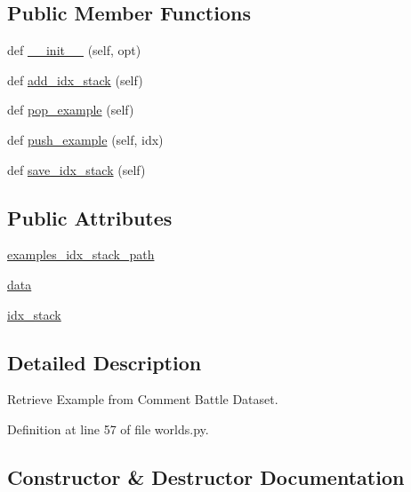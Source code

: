 \subsection*{Public Member Functions}
\begin{DoxyCompactItemize}
\item 
def \hyperlink{classigc__evals_1_1worlds_1_1IGCExampleGenerator_a44d9772a080f6ec923cdd13392a47f5e}{\+\_\+\+\_\+init\+\_\+\+\_\+} (self, opt)
\item 
def \hyperlink{classigc__evals_1_1worlds_1_1IGCExampleGenerator_aa0801aa3a53c7fd57a759c2080936174}{add\+\_\+idx\+\_\+stack} (self)
\item 
def \hyperlink{classigc__evals_1_1worlds_1_1IGCExampleGenerator_a68420b6b80ae5d3a8825302359371ed5}{pop\+\_\+example} (self)
\item 
def \hyperlink{classigc__evals_1_1worlds_1_1IGCExampleGenerator_a34dc6ef46a9ba8a1c72c8b674ff444b9}{push\+\_\+example} (self, idx)
\item 
def \hyperlink{classigc__evals_1_1worlds_1_1IGCExampleGenerator_a3f787da040d9b83d9c857b8ef65d36eb}{save\+\_\+idx\+\_\+stack} (self)
\end{DoxyCompactItemize}
\subsection*{Public Attributes}
\begin{DoxyCompactItemize}
\item 
\hyperlink{classigc__evals_1_1worlds_1_1IGCExampleGenerator_aa309ee59a607d747c0f9868951ecba0a}{examples\+\_\+idx\+\_\+stack\+\_\+path}
\item 
\hyperlink{classigc__evals_1_1worlds_1_1IGCExampleGenerator_ab21dfe02e8b60d4e37e25b8d942c4b61}{data}
\item 
\hyperlink{classigc__evals_1_1worlds_1_1IGCExampleGenerator_ac091cb764c64196d922d65d030f6ec57}{idx\+\_\+stack}
\end{DoxyCompactItemize}


\subsection{Detailed Description}
\begin{DoxyVerb}Retrieve Example from Comment Battle Dataset.
\end{DoxyVerb}
 

Definition at line 57 of file worlds.\+py.



\subsection{Constructor \& Destructor Documentation}
\mbox{\label{classigc__evals_1_1worlds_1_1IGCExampleGenerator_a44d9772a080f6ec923cdd13392a47f5e}} 
